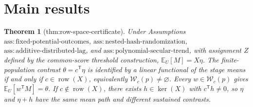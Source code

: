 \documentclass{article}
\newtheorem{theorem}{Theorem}
\begin{document}
\section{Main results}

\begin{theorem}[thm:row-space-certificate]\label{thm:row-space-certificate}
Under Assumptions \(\mathrm{ass:fixed\text{-}potential\text{-}outcomes}\), \(\mathrm{ass:nested\text{-}hash\text{-}randomization}\), \(\mathrm{ass:additive\text{-}distributed\text{-}lag}\), and \(\mathrm{ass:polynomial\text{-}secular\text{-}trend}\), with assignment \(Z\) defined by the common-score threshold construction, \(\mathbb E_U[M]=X\eta\). The finite-population contrast \(\theta=c^{\mathsf T}\eta\) is identified by a linear functional of the stage means if and only if \(c\in\operatorname{row}(X)\), equivalently \(\mathcal W_c(p)\ne\varnothing\). Every \(w\in\mathcal W_c(p)\) gives \(\mathbb E_U[w^{\mathsf T}M]=\theta\). If \(c\notin\operatorname{row}(X)\), there exists \(h\in\ker(X)\) with \(c^{\mathsf T}h\ne0\), so \(\eta\) and \(\eta+h\) have the same mean path and different sustained contrasts.
\end{theorem}
\end{document}
